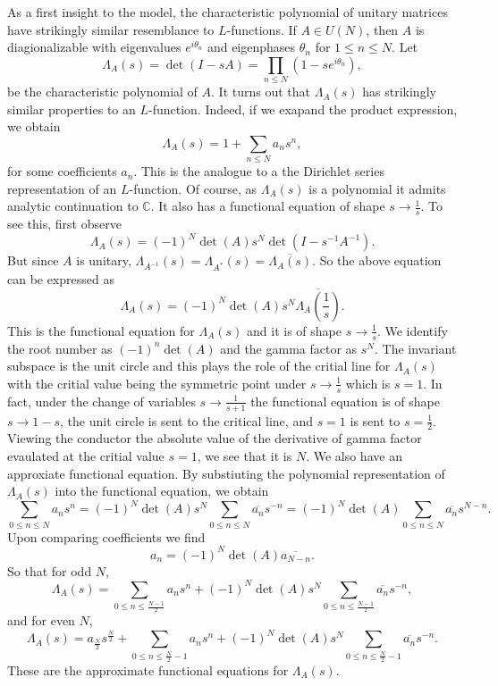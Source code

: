 \documentclass[12pt]{book}
\theoremstyle{definition}\newframedtheorem{method}{Method}
\newcommand{\C}{\mathbb{C}}
\renewcommand{\t}{\theta}
\renewcommand{\L}{\Lambda}
\newcommand{\<}{\langle}
\renewcommand{\>}{\rangle}
\newcommand{\conj}{\overline}
\begin{document}
      As a first insight to the model, the characteristic polynomial of unitary matrices have strikingly similar resemblance to $L$-functions. If $A \in U(N)$, then $A$ is diagionalizable with eigenvalues $e^{i\t_{n}}$ and eigenphases $\t_{n}$ for $1 \le n \le N$. Let
      \[
        \L_{A}(s) = \det(I-sA) = \prod_{n \le N}(1-se^{i\t_{n}}),
      \]
      be the characteristic polynomial of $A$. It turns out that $\L_{A}(s)$ has strikingly similar properties to an $L$-function. Indeed, if we exapand the product expression, we obtain
      \[
        \L_{A}(s) = 1+\sum_{n \le N}a_{n}s^{n},
      \]
      for some coefficients $a_{n}$. This is the analogue to a the Dirichlet series representation of an $L$-function. Of course, as $\L_{A}(s)$ is a polynomial it admits analytic continuation to $\C$. It also has a functional equation of shape $s \to \frac{1}{s}$. To see this, first observe
      \[
        \L_{A}(s) = (-1)^{N}\det(A)s^{N}\det(I-s^{-1}A^{-1}).
      \]
      But since $A$ is unitary, $\L_{A^{-1}}(s) = \L_{A^{\ast}}(s) = \conj{\L_{A}(s)}$. So the above equation can be expressed as
      \[
        \L_{A}(s) = (-1)^{N}\det(A)s^{N}\conj{\L_{A}\left(\frac{1}{s}\right)}.
      \]
      This is the functional equation for $\L_{A}(s)$ and it is of shape $s \to \frac{1}{s}$. We identify the root number as $(-1)^{n}\det(A)$ and the gamma factor as $s^{N}$. The invariant subspace is the unit circle and this plays the role of the critial line for $\L_{A}(s)$ with the critial value being the symmetric point under $s \to \frac{1}{s}$ which is $s = 1$. In fact, under the change of variables $s \to \frac{1}{s+1}$ the functional equation is of shape $s \to 1-s$, the unit circle is sent to the critical line, and $s = 1$ is sent to $s = \frac{1}{2}$. Viewing the conductor the absolute value of the derivative of gamma factor evaulated at the critial value $s = 1$, we see that it is $N$. We also have an approxiate functional equation. By substiuting the polynomial representation of $\L_{A}(s)$ into the functional equation, we obtain
      \[
        \sum_{0 \le n \le N}a_{n}s^{n} = (-1)^{N}\det(A)s^{N}\sum_{0 \le n \le N}\conj{a_{n}}s^{-n} = (-1)^{N}\det(A)\sum_{0 \le n \le N}\conj{a_{n}}s^{N-n}.
      \]
      Upon comparing coefficients we find
      \[
        a_{n} = (-1)^{N}\det(A)\conj{a_{N-n}}.
      \]
      So that for odd $N$,
      \[
        \L_{A}(s) = \sum_{0 \le n \le \frac{N-1}{2}}a_{n}s^{n}+(-1)^{N}\det(A)s^{N}\sum_{0 \le n \le \frac{N-1}{2}}\conj{a_{n}}s^{-n},
      \]
      and for even $N$,
      \[
        \L_{A}(s) = a_{\frac{N}{2}}s^{\frac{N}{2}}+\sum_{0 \le n \le \frac{N}{2}-1}a_{n}s^{n}+(-1)^{N}\det(A)s^{N}\sum_{0 \le n \le \frac{N}{2}-1}\conj{a_{n}}s^{-n}.
      \]
      These are the approximate functional equations for $\L_{A}(s)$.
\end{document}
